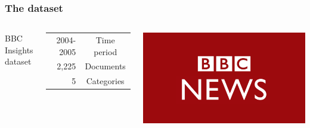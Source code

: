 \documentclass{beamer}
\begin{document}
		
		\begin{frame}
			\frametitle{The dataset}
			\begin {columns}
			 \large{BBC Insights dataset \super{[5]} } \\ \medskip
			 
			 \begin{table}
			 \begin{tabular}{r c}
			 2004-2005 & \textcolor{ExecusharesGrey}{ Time period } \\
			 2,225 & \textcolor{ExecusharesGrey}{ Documents } \\
			 5 & \textcolor{ExecusharesGrey}{ Categories } \\
			 
			 \end{tabular}
			 \end {table}
			\includegraphics[width=\textwidth]{bbc.png}
			\end {columns}
		    		
		\end{frame}
		
\end{document}
